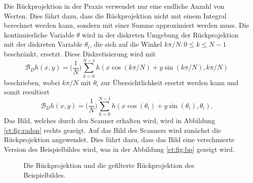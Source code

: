 Die Rückprojektion in der Praxis verwendet nur eine endliche Anzahl von Werten. Dies führt dazu, dass die Rückprojektion nicht mit einem Integral berechnet werden kann, sondern mit einer Summe approximiert werden muss. 
Die kontinuierliche Variable $\theta$ wird in der diskreten Umgebung der Rückprojektion mit der diskreten Variable $\theta_i$, die sich auf die Winkel ${k\pi/N: 0\le k \le N-1}$ beschränkt, ersetzt. Diese Diskretisierung wird mit 
\begin{equation}\label{ct:discreteBP}
		\mathscr{B}_Dh(x, y) = \biggl(\dfrac{1}{N}\biggr)\sum_{k=0}^{N-1} h(x\cos(k\pi/N)+y\sin(k\pi/N), k\pi/N)
\end{equation}
beschrieben, wobei $k\pi/N$ mit $\theta_i$ zur Übersichtlichkeit ersetzt werden kann und somit resultiert
\begin{equation}\label{ct:discreteBP_w_theta}
	\mathscr{B}_Dh(x, y) = \biggl(\dfrac{1}{N}\biggr)\sum_{k=0}^{N-1} h(x\cos(\theta_i)+y\sin(\theta_i), \theta_i).
\end{equation}
Das Bild, welches durch den Scanner erhalten wird, wird in Abbildung \ref{ct:fig:radon} rechts gezeigt.
Auf das Bild des Scanners wird zunächst die Rückprojektion angewendet. Dies führt dazu, dass das Bild eine \glqq verschmierte\grqq{} Version des Beispielbildes wird, was in der Abbildung \ref{ct:fig:bp} gezeigt wird.

\begin{figure}
	\centering
	\caption{Die Rückprojektion und die gefilterte Rückprojektion des Beispielbildes.}
\end{figure}

